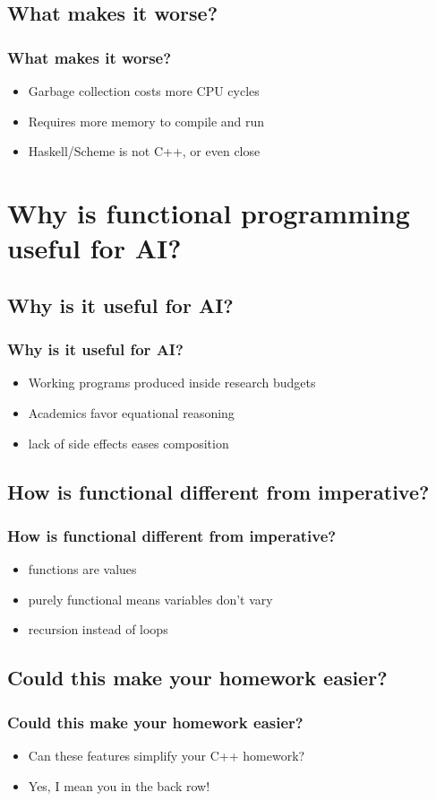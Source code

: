 \documentclass[xcolor=pdftex,dvipsnames,table]{beamer}
\begin{document}
\subsection{What makes it worse?}

\begin{frame}
  \frametitle{What makes it worse?}
  \begin{itemize}
  \item Garbage collection costs more CPU cycles
  \item Requires more memory to compile and run
  \item Haskell/Scheme is not C++, or even close
  \end{itemize}
\end{frame}

\section{Why is functional programming useful for AI?}
\subsection{Why is it useful for AI?}
\begin{frame}
  \frametitle{Why is it useful for AI?}
  \begin{itemize}
  \item Working programs produced inside research budgets
  \item Academics favor equational reasoning
  \item lack of side effects eases composition
  \end{itemize}
\end{frame}

\subsection{How is functional different from imperative?}
\begin{frame}
  \frametitle{How is functional different from imperative?}
  \begin{itemize}
  \item functions are values
  \item purely functional means variables don't vary
  \item recursion instead of loops
  \end{itemize}
\end{frame}


\subsection{Could this make your homework easier?}
\begin{frame}
  \frametitle{Could this make your homework easier?}
  \begin{itemize}
  \item Can these features simplify your C++ homework?
  \item Yes, I mean you in the back row!
  \end{itemize}
\end{frame}
\end{document}
